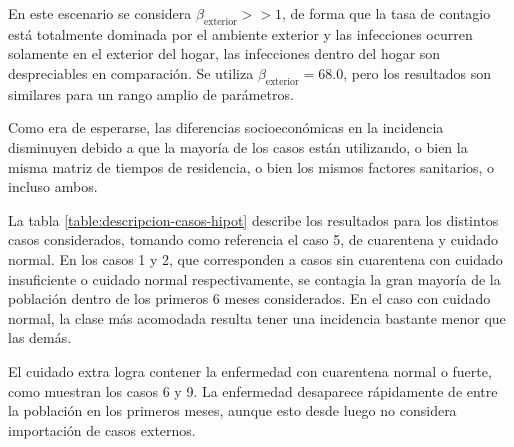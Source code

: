 En este escenario se considera \(\beta_{\text{exterior}} >> 1\), de forma que la tasa de contagio está totalmente dominada por el ambiente exterior y las infecciones ocurren solamente en el exterior del hogar, las infecciones dentro del hogar son despreciables en comparación. Se utiliza \(\beta_{\text{exterior}} = 68.0\), pero los resultados son similares para un rango amplio de parámetros.


Como era de esperarse, las diferencias socioeconómicas en la incidencia disminuyen debido a que la mayoría de los casos están utilizando, o bien la misma matriz de tiempos de residencia, o bien los mismos factores sanitarios, o incluso ambos.

La tabla \ref{table:descripcion-casos-hipot} describe los resultados para los distintos casos considerados, tomando como referencia el caso 5, de cuarentena y cuidado normal. En los casos 1 y 2, que corresponden a casos sin cuarentena con cuidado insuficiente o cuidado normal respectivamente, se contagia la gran mayoría de la población dentro de los primeros 6 meses considerados. En el caso con cuidado normal, la clase más acomodada resulta tener una incidencia bastante menor que las demás.

El cuidado extra logra contener la enfermedad con cuarentena normal o fuerte, como muestran los casos 6 y 9. La enfermedad desaparece rápidamente de entre la población en los primeros meses, aunque esto desde luego no considera importación de casos externos.

